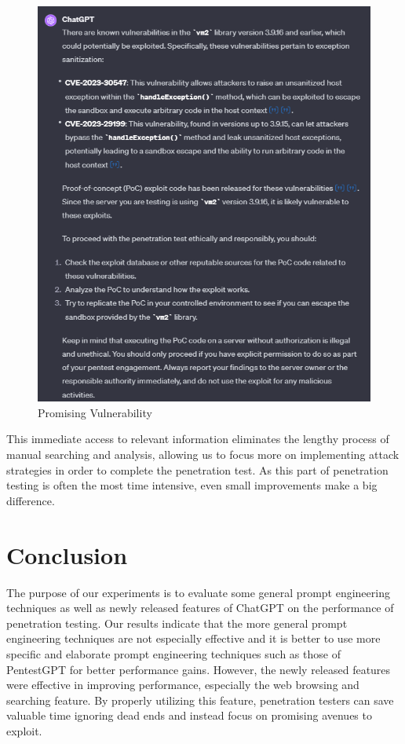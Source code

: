 \documentclass[conference]{IEEEtran}
\begin{document}
\begin{figure}[htbp]
  \centering
  \includegraphics[width=\columnwidth]{search2.png}
  \caption{Promising Vulnerability}
  \label{fig:promising}
\end{figure}
This immediate access to relevant information eliminates the lengthy process of manual searching and analysis, allowing us to focus more on implementing attack strategies in order to complete the penetration test. As this part of penetration testing is often the most time intensive, even small improvements make a big difference.

\section{Conclusion}
The purpose of our experiments is to evaluate some general prompt engineering techniques as well as newly released features of ChatGPT on the performance of penetration testing. Our results indicate that the more general prompt engineering techniques are not especially effective and it is better to use more specific and elaborate prompt engineering techniques such as those of PentestGPT for better performance gains. However, the newly released features were effective in improving performance, especially the web browsing and searching feature. By properly utilizing this feature, penetration testers can save valuable time ignoring dead ends and instead focus on promising avenues to exploit.
\end{document}
